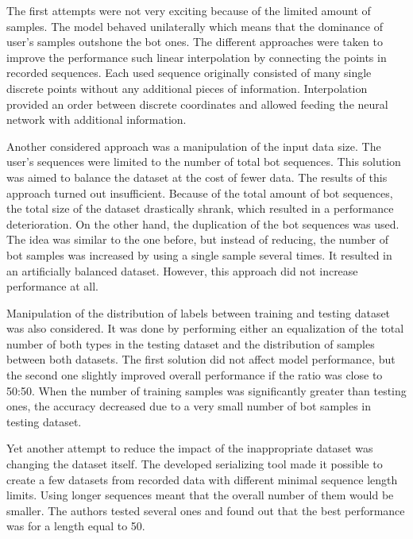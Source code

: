 The first attempts were not very exciting because of the limited amount of samples.
The model behaved unilaterally which means that the dominance of user's samples outshone the bot ones.
The different approaches were taken to improve the performance such linear interpolation by connecting the points in recorded sequences.
Each used sequence originally consisted of many single discrete points without any additional pieces of information.
Interpolation provided an order between discrete coordinates and allowed feeding the neural network with additional information.

Another considered approach was a manipulation of the input data size.
The user's sequences were limited to the number of total bot sequences.
This solution was aimed to balance the dataset at the cost of fewer data.
The results of this approach turned out insufficient.
Because of the total amount of bot sequences, the total size of the dataset drastically shrank, which resulted in a performance deterioration.
On the other hand, the duplication of the bot sequences was used.
The idea was similar to the one before, but instead of reducing, the number of bot samples was increased by using a single sample several times.
It resulted in an artificially balanced dataset.
However, this approach did not increase performance at all.

Manipulation of the distribution of labels between training and testing dataset was also considered.
It was done by performing either an equalization of the total number of both types in the testing dataset and the distribution of samples between both datasets.
The first solution did not affect model performance, but the second one slightly improved overall performance if the ratio was close to 50:50.
When the number of training samples was significantly greater than testing ones, the accuracy decreased due to a very small number of bot samples in testing dataset.

Yet another attempt to reduce the impact of the inappropriate dataset was changing the dataset itself.
The developed serializing tool made it possible to create a few datasets from recorded data with different minimal sequence length limits.
Using longer sequences meant that the overall number of them would be smaller.
The authors tested several ones and found out that the best performance was for a length equal to 50.

